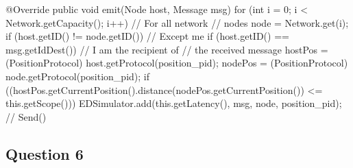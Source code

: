 \documentclass[10pt]{report}
\begin{document}
\begin{boxedlisting}
@Override
public void emit(Node host, Message msg) {
	for (int i = 0; i < Network.getCapacity(); i++) { // For all network
															// nodes
		node = Network.get(i);
		if (host.getID() != node.getID()) { // Except me
			if (host.getID() == msg.getIdDest()) { // I am the recipient of
														// the received message
				hostPos = (PositionProtocol) host.getProtocol(position_pid);
				nodePos = (PositionProtocol) node.getProtocol(position_pid);
				if ((hostPos.getCurrentPosition().distance(nodePos.getCurrentPosition()) <= this.getScope())) {
					EDSimulator.add(this.getLatency(), msg, node, position_pid); // Send()
				}
			}
		}
	}
}
\end{boxedlisting}

\subsection{Question 6}
\end{document}
